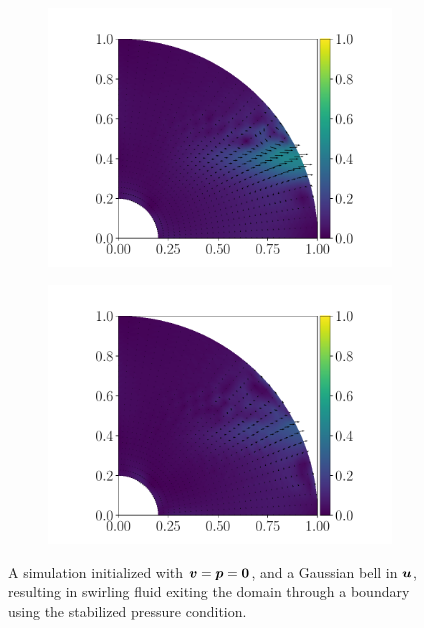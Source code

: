 \begin{figure}
\begin{subfigure}{0.24\textwidth}
    \includegraphics[width=\textwidth]{images/outflow3.pdf}
  \end{subfigure}
  \begin{subfigure}{0.24\textwidth}
    \includegraphics[width=\textwidth]{images/outflow4.pdf}
  \end{subfigure}
  \caption{A simulation initialized with $\bm{v} = \bm{p} = \bm{0}$, and a Gaussian bell in $\bm{u}$, resulting in swirling fluid exiting the domain through a boundary using the stabilized pressure condition.}%
  \label{fig:stab_pressure}
\end{figure}
